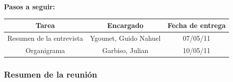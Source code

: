 \documentclass[a4paper,10pt,titlepage]{article}
\begin{document}

%
%

\vspace{10cm}
\textbf{Pasos a seguir:}\\
	    \begin{center}
	    \begin{tabular}{|c|c|c|}
		    \hline \textbf{Tarea} & \textbf{Encargado} & \textbf{Fecha de entrega} \\ 
		    \hline Resumen de la entrevista & Ygounet, Guido Nahuel & 07/05/11 \\ 
		    \hline Organigrama & Garbiso, Julian & 10/05/11 \\ 
		    \hline 
	    \end{tabular}
	    \end{center}

\newpage
\subsubsection*{Resumen de la reuni\'on}
\end{document}
